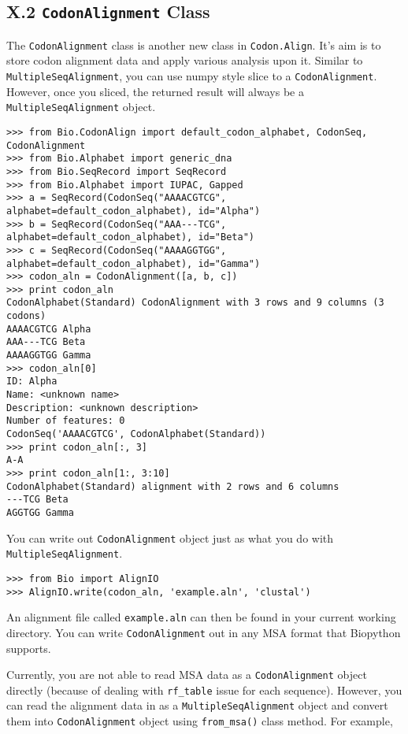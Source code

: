 \documentclass{article}
\begin{document}
\subsection{X.2 \texttt{CodonAlignment} Class}

The \texttt{CodonAlignment} class is another new class in
\texttt{Codon.Align}. It's aim is to store codon alignment data and
apply various analysis upon it. Similar to
\texttt{MultipleSeqAlignment}, you can use numpy style slice to a
\texttt{CodonAlignment}. However, once you sliced, the returned result
will always be a \texttt{MultipleSeqAlignment} object.

\begin{verbatim}
>>> from Bio.CodonAlign import default_codon_alphabet, CodonSeq, CodonAlignment
>>> from Bio.Alphabet import generic_dna
>>> from Bio.SeqRecord import SeqRecord
>>> from Bio.Alphabet import IUPAC, Gapped
>>> a = SeqRecord(CodonSeq("AAAACGTCG", alphabet=default_codon_alphabet), id="Alpha")
>>> b = SeqRecord(CodonSeq("AAA---TCG", alphabet=default_codon_alphabet), id="Beta")
>>> c = SeqRecord(CodonSeq("AAAAGGTGG", alphabet=default_codon_alphabet), id="Gamma")
>>> codon_aln = CodonAlignment([a, b, c])
>>> print codon_aln
CodonAlphabet(Standard) CodonAlignment with 3 rows and 9 columns (3 codons)
AAAACGTCG Alpha
AAA---TCG Beta
AAAAGGTGG Gamma
>>> codon_aln[0]
ID: Alpha
Name: <unknown name>
Description: <unknown description>
Number of features: 0
CodonSeq('AAAACGTCG', CodonAlphabet(Standard))
>>> print codon_aln[:, 3]
A-A
>>> print codon_aln[1:, 3:10]
CodonAlphabet(Standard) alignment with 2 rows and 6 columns
---TCG Beta
AGGTGG Gamma
\end{verbatim}

You can write out \texttt{CodonAlignment} object just as what you do
with \texttt{MultipleSeqAlignment}.

\begin{verbatim}
>>> from Bio import AlignIO
>>> AlignIO.write(codon_aln, 'example.aln', 'clustal')
\end{verbatim}

An alignment file called \texttt{example.aln} can then be found in your
current working directory. You can write \texttt{CodonAlignment} out in
any MSA format that Biopython supports.

Currently, you are not able to read MSA data as a
\texttt{CodonAlignment} object directly (because of dealing with
\texttt{rf\_table} issue for each sequence). However, you can read the
alignment data in as a \texttt{MultipleSeqAlignment} object and convert
them into \texttt{CodonAlignment} object using \texttt{from\_msa()}
class method. For example,
\end{document}
